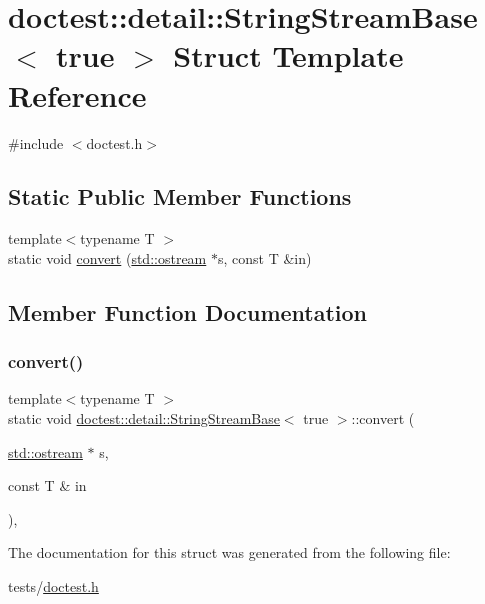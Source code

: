 \hypertarget{structdoctest_1_1detail_1_1StringStreamBase_3_01true_01_4}{}\section{doctest\+:\+:detail\+:\+:String\+Stream\+Base$<$ true $>$ Struct Template Reference}
\label{structdoctest_1_1detail_1_1StringStreamBase_3_01true_01_4}


{\ttfamily \#include $<$doctest.\+h$>$}

\subsection*{Static Public Member Functions}
\begin{DoxyCompactItemize}
\item 
{\footnotesize template$<$typename T $>$ }\\static void \hyperlink{structdoctest_1_1detail_1_1StringStreamBase_3_01true_01_4_a3f86285d254474498065e6b70522e2b7}{convert} (\hyperlink{doctest_8h_a116af65cb5e924b33ad9d9ecd7a783f3}{std\+::ostream} $\ast$s, const T \&in)
\end{DoxyCompactItemize}


\subsection{Member Function Documentation}
\mbox{\label{structdoctest_1_1detail_1_1StringStreamBase_3_01true_01_4_a3f86285d254474498065e6b70522e2b7}} 
\subsubsection{\texorpdfstring{convert()}{convert()}}
{\footnotesize\ttfamily template$<$typename T $>$ \\
static void \hyperlink{structdoctest_1_1detail_1_1StringStreamBase}{doctest\+::detail\+::\+String\+Stream\+Base}$<$ true $>$\+::convert (\begin{DoxyParamCaption}\item[{\hyperlink{doctest_8h_a116af65cb5e924b33ad9d9ecd7a783f3}{std\+::ostream} $\ast$}]{s,  }\item[{const T \&}]{in }\end{DoxyParamCaption})\hspace{0.3cm}{\ttfamily [inline]}, {\ttfamily [static]}}



The documentation for this struct was generated from the following file\+:\begin{DoxyCompactItemize}
\item 
tests/\hyperlink{doctest_8h}{doctest.\+h}\end{DoxyCompactItemize}
